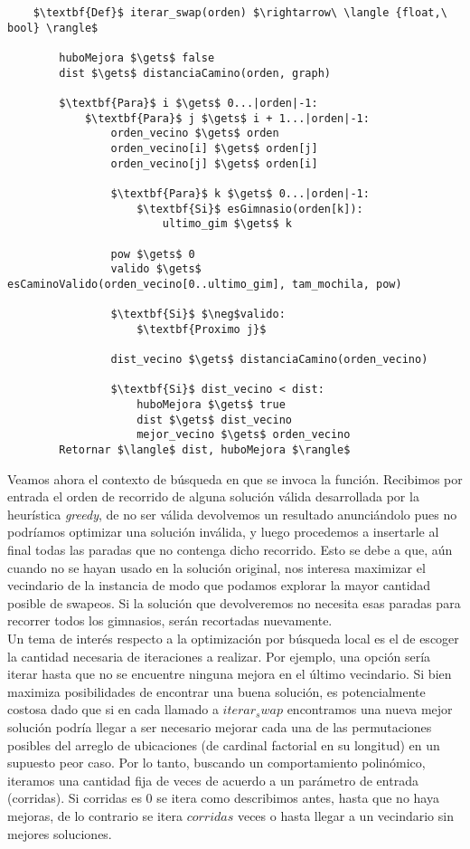     \begin{lstlisting}
    $\textbf{Def}$ iterar_swap(orden) $\rightarrow\ \langle {float,\ bool} \rangle$

        huboMejora $\gets$ false
        dist $\gets$ distanciaCamino(orden, graph)

        $\textbf{Para}$ i $\gets$ 0...|orden|-1:
            $\textbf{Para}$ j $\gets$ i + 1...|orden|-1:
                orden_vecino $\gets$ orden
                orden_vecino[i] $\gets$ orden[j]
                orden_vecino[j] $\gets$ orden[i]

                $\textbf{Para}$ k $\gets$ 0...|orden|-1:
                    $\textbf{Si}$ esGimnasio(orden[k]):
                        ultimo_gim $\gets$ k

                pow $\gets$ 0
                valido $\gets$ esCaminoValido(orden_vecino[0..ultimo_gim], tam_mochila, pow)

                $\textbf{Si}$ $\neg$valido:
                    $\textbf{Proximo j}$

                dist_vecino $\gets$ distanciaCamino(orden_vecino)

                $\textbf{Si}$ dist_vecino < dist:
                    huboMejora $\gets$ true
                    dist $\gets$ dist_vecino
                    mejor_vecino $\gets$ orden_vecino
        Retornar $\langle$ dist, huboMejora $\rangle$
    \end{lstlisting}

    Veamos ahora el contexto de búsqueda en que se invoca la función. Recibimos por entrada el orden de recorrido de alguna solución válida desarrollada por la heurística \emph{greedy}, de no ser válida devolvemos un resultado anunciándolo pues no podríamos optimizar una solución inválida, y luego procedemos a insertarle al final todas las paradas que no contenga dicho recorrido. Esto se debe a que, aún cuando no se hayan usado en la solución original, nos interesa maximizar el vecindario de la instancia de modo que podamos explorar la mayor cantidad posible de swapeos. Si la solución que devolveremos no necesita esas paradas para recorrer todos los gimnasios, serán recortadas nuevamente.
    \\

    Un tema de interés respecto a la optimización por búsqueda local es el de escoger la cantidad necesaria de iteraciones a realizar. Por ejemplo, una opción sería iterar hasta que no se encuentre ninguna mejora en el último vecindario. Si bien maximiza posibilidades de encontrar una buena solución, es potencialmente costosa dado que si en cada llamado a $iterar_swap$ encontramos una nueva mejor solución podría llegar a ser necesario mejorar cada una de las permutaciones posibles del arreglo de ubicaciones (de cardinal factorial en su longitud) en un supuesto peor caso. Por lo tanto, buscando un comportamiento polinómico, iteramos una cantidad fija de veces de acuerdo a un parámetro de entrada (corridas). Si corridas es 0 se itera como describimos antes, hasta que no haya mejoras, de lo contrario se itera $corridas$ veces o hasta llegar a un vecindario sin mejores soluciones.

